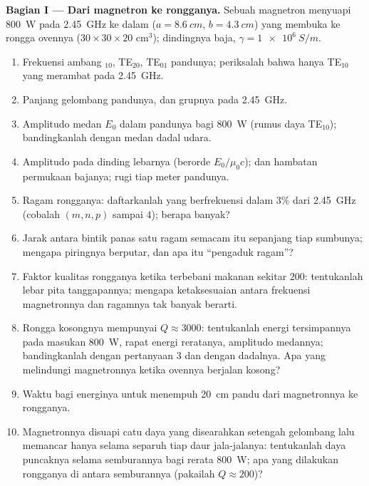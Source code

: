 \begin{problem}
\label{pb:b2:guided-waves:1}

\medskip
\noindent\textbf{Bagian I --- Dari magnetron ke rongganya.}
Sebuah magnetron menyuapi \qty{800}{W} pada \qty{2.45}{GHz} ke dalam  ($a = \qty{8.6}{cm}$, $b = \qty{4.3}{cm}$) yang membuka ke rongga
ovennya ($30 \times 30 \times 20$ cm$^3$); dindingnya baja, $\gamma = \qty{1e6}{S/m}$.
\begin{enumerate}
  \item Frekuensi ambang $_{10}$, TE$_{20}$, TE$_{01}$ pandunya;
        periksalah bahwa hanya TE$_{10}$ yang merambat pada \qty{2.45}{GHz}.
  \item Panjang gelombang pandunya,  dan grupnya pada \qty{2.45}{GHz}.
  \item Amplitudo medan $E_0$ dalam pandunya bagi \qty{800}{W} (rumus daya
        TE$_{10}$); bandingkanlah dengan medan dadal udara.
  \item Amplitudo  pada dinding lebarnya (berorde
        $E_0/\mu_0c$);  dan hambatan permukaan bajanya;
        rugi tiap meter pandunya.
  \item Ragam rongganya: daftarkanlah yang berfrekuensi dalam $3\%$
        dari \qty{2.45}{GHz} (cobalah $(m, n, p)$ sampai $4$); berapa banyak?
  \item Jarak antara bintik panas satu ragam semacam itu sepanjang tiap
        sumbunya; mengapa piringnya berputar, dan apa itu ``pengaduk ragam''?
  \item Faktor kualitas rongganya ketika terbebani makanan sekitar
        $200$: tentukanlah lebar pita tanggapannya; mengapa ketaksesuaian antara
        frekuensi magnetronnya dan ragamnya tak banyak berarti.
  \item Rongga kosongnya mempunyai $Q \approx 3000$: tentukanlah energi tersimpannya pada masukan
        \qty{800}{W}, rapat energi reratanya, amplitudo medannya; bandingkanlah dengan
        pertanyaan 3 dan dengan dadalnya. Apa yang melindungi magnetronnya
        ketika ovennya berjalan kosong?
  \item Waktu bagi energinya untuk menempuh \qty{20}{cm} pandu dari
        magnetronnya ke rongganya.
  \item Magnetronnya disuapi catu daya yang disearahkan setengah gelombang lalu memancar
        hanya selama separuh tiap daur jala-jalanya: tentukanlah daya puncaknya selama
        semburannya bagi rerata \qty{800}{W}; apa yang dilakukan rongganya
        di antara semburannya (pakailah $Q \approx 200$)?
\end{enumerate}


\end{problem}
